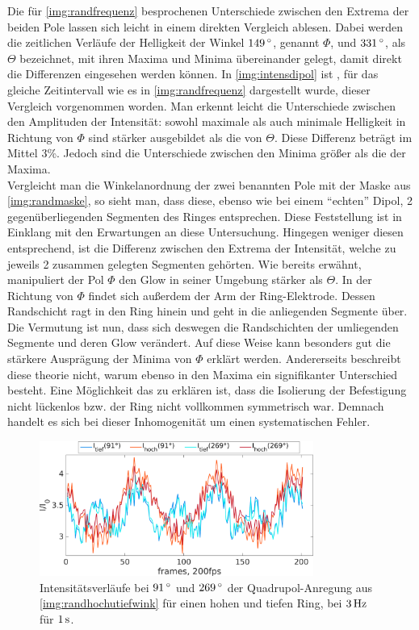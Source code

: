 \documentclass[numbers=noenddot,a4paper,notitlepage,twoside,BCOR15mm]{scrbook}
\newcommand{\degree}{^\circ}
\begin{document}
					Die für \autoref{img:randfrequenz} besprochenen Unterschiede zwischen den Extrema der beiden Pole lassen sich leicht in einem direkten Vergleich ablesen. Dabei werden die zeitlichen Verläufe der Helligkeit der Winkel $\unit[149]{\degree}$, genannt $\Phi$, und $\unit[331]{\degree}$, als $\Theta$ bezeichnet, mit ihren Maxima und Minima übereinander gelegt, damit direkt die Differenzen eingesehen werden können. In \autoref{img:intensdipol} ist , für das gleiche Zeitintervall wie es in \autoref{img:randfrequenz} dargestellt wurde, dieser Vergleich vorgenommen worden. Man erkennt leicht die Unterschiede zwischen den Amplituden der Intensität: sowohl maximale als auch minimale Helligkeit in Richtung von $\Phi$ sind stärker ausgebildet als die von $\Theta$. Diese Differenz beträgt im Mittel 3\%. Jedoch sind die Unterschiede zwischen den Minima größer als die der Maxima.\\
					Vergleicht man die Winkelanordnung der zwei benannten Pole mit der Maske aus \autoref{img:randmaske}, so sieht man, dass diese, ebenso wie bei einem "`echten"' Dipol, 2 gegenüberliegenden Segmenten des Ringes entsprechen. Diese Feststellung ist in Einklang mit den Erwartungen an diese Untersuchung. Hingegen weniger diesen entsprechend, ist die Differenz zwischen den Extrema der Intensität, welche zu jeweils 2 zusammen gelegten Segmenten gehörten. Wie bereits erwähnt, manipuliert der Pol $\Phi$ den Glow in seiner Umgebung stärker als $\Theta$. In der Richtung von $\Phi$ findet sich außerdem der Arm der Ring-Elektrode. Dessen Randschicht ragt in den Ring hinein und geht in die anliegenden Segmente über. Die Vermutung ist nun, dass sich deswegen die Randschichten der umliegenden Segmente und deren Glow verändert. Auf diese Weise kann besonders gut die stärkere Ausprägung der Minima von $\Phi$ erklärt werden. Andererseits beschreibt diese theorie nicht, warum ebenso in den Maxima ein signifikanter Unterschied besteht. Eine Möglichkeit das zu erklären ist, dass die Isolierung der Befestigung nicht lückenlos bzw. der Ring nicht vollkommen symmetrisch war. Demnach handelt es sich bei dieser Inhomogenität um einen systematischen Fehler.

						\begin{figure}[!b]
							\centering
							\includegraphics[width=0.8\textwidth,height=0.45\textwidth]{figs/auswertung/plasmaglw/intens270u90hochutiefquad3Hz1sek.png}
							\caption{Intensitätsverläufe bei $\unit[91]{\degree}$ und $\unit[269]{\degree}$ der Quadrupol-Anregung aus \autoref{img:randhochutiefwink} für einen hohen und tiefen Ring, bei $\unit[3]{Hz}$ für $\unit[1]{s}$. }
							\label{img:intensquadhochutief}
						\end{figure}
\end{document}
